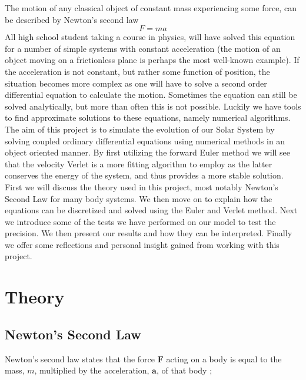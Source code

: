 \documentclass[12pt]{article}
\numberwithin{figure}{section}
\numberwithin{table}{section}
\begin{document}
\noindent The motion of any classical object of constant mass experiencing some force, can be described by Newton's second law
\begin{equation}
   F=ma
\end{equation}
All high school student taking a course in physics, will have solved this equation for a number of simple systems with constant acceleration (the motion of an object moving on a frictionless plane is perhaps the most well-known example). If the acceleration is not constant, but rather some function of position, the situation becomes more complex as one will have to solve a second order differential equation to calculate the motion. Sometimes the equation can still be solved analytically, but more than often this is not possible. Luckily we have tools to find approximate solutions to these equations, namely numerical algorithms. \\

\noindent The aim of this project is to simulate the evolution of our Solar System by solving coupled ordinary differential equations using numerical methods in an object oriented manner. By first utilizing the forward Euler method we will see that the velocity Verlet is a more fitting algorithm to employ as the latter conserves the energy of the system, and thus provides a more stable solution. \\

\noindent First we will discuss the theory used in this project, most notably Newton's Second Law for many body systems.  We then move on to explain how the equations can be discretized and solved using the Euler and Verlet method. Next we introduce some of the tests we have performed on our model to test the precision. We then present our results and how they can be interpreted. Finally we offer some reflections and personal insight gained from working with this project.\\


\section{Theory} \label{sec:theory}
 
\subsection{Newton's Second Law }
\noindent  Newton's second law  states that the force $\mathbf{F}$ acting on a body is equal to the mass, $m$, multiplied by the acceleration, $\mathbf{a}$, of that body \cite{newton-principia}; 
\end{document}
